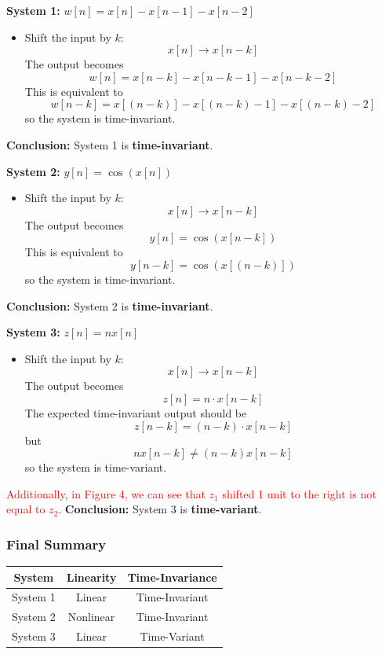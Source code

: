 \documentclass[12pt,a4paper,UTF8]{article}
\begin{document}
\vspace{0.5em}

\textbf{System 1:} \( w[n] = x[n] - x[n-1] - x[n-2] \)  
\begin{itemize}
    \item Shift the input by \( k \):  
    \[
    x[n] \to x[n - k]
    \]  
    The output becomes  
    \[
    w[n] = x[n - k] - x[n - k - 1] - x[n - k - 2]
    \]  
    This is equivalent to  
    \[
    w[n - k] = x[(n - k)] - x[(n - k) - 1] - x[(n - k) - 2]
    \]  
    so the system is time-invariant.
\end{itemize}  
\textbf{Conclusion:} System 1 is \textbf{time-invariant}.

\vspace{0.5em}

\textbf{System 2:} \( y[n] = \cos(x[n]) \)  
\begin{itemize}
    \item Shift the input by \( k \):  
    \[
    x[n] \to x[n - k]
    \]  
    The output becomes  
    \[
    y[n] = \cos(x[n - k])
    \]  
    This is equivalent to  
    \[
    y[n - k] = \cos(x[(n - k)])
    \]  
    so the system is time-invariant.
\end{itemize}  
\textbf{Conclusion:} System 2 is \textbf{time-invariant}.

\vspace{0.5em}

\textbf{System 3:} \( z[n] = n x[n] \)  
\begin{itemize}
    \item Shift the input by \( k \):  
    \[
    x[n] \to x[n - k]
    \]  
    The output becomes  
    \[
    z[n] = n \cdot x[n - k]
    \]  
    The expected time-invariant output should be  
    \[
    z[n - k] = (n - k) \cdot x[n - k]
    \]  
    but  
    \[
    n x[n - k] \neq (n - k) x[n - k]
    \]  
    so the system is time-variant.
\end{itemize}  
\textcolor{red}{Additionally, in Figure 4, we can see that 
$z_1$ shifted 1 unit to the right is not equal to $z_2$.} 
\textbf{Conclusion:} System 3 is \textbf{time-variant}.

\vspace{1em}

\subsubsection*{Final Summary}

\begin{center}
\begin{tabular}{|c|c|c|}
\hline
\textbf{System} & \textbf{Linearity} & \textbf{Time-Invariance} \\
\hline
System 1 & Linear & Time-Invariant \\
System 2 & Nonlinear & Time-Invariant \\
System 3 & Linear & Time-Variant \\
\hline
\end{tabular}
\end{center}
\end{document}
